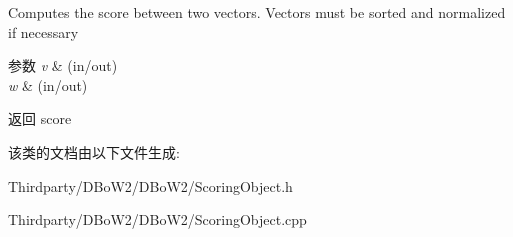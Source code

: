 Computes the score between two vectors. Vectors must be sorted and normalized if necessary 
\begin{DoxyParams}{参数}
{\em v} & (in/out) \\
\hline
{\em w} & (in/out) \\
\hline
\end{DoxyParams}
\begin{DoxyReturn}{返回}
score 
\end{DoxyReturn}


该类的文档由以下文件生成\-:\begin{DoxyCompactItemize}
\item 
Thirdparty/\-D\-Bo\-W2/\-D\-Bo\-W2/Scoring\-Object.\-h\item 
Thirdparty/\-D\-Bo\-W2/\-D\-Bo\-W2/Scoring\-Object.\-cpp\end{DoxyCompactItemize}
